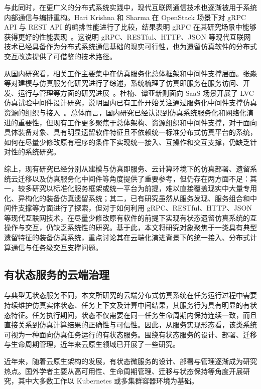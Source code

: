 \documentclass[lang=chs, degree=master, blindreview=true, winfonts=true, academic=false]{yanputhesis}
\begin{document}
与此同时，在更广义的分布式系统实践中，现代互联网通信技术也逐渐被用于系统内部通信与编排重构。Hari Krishna 和 Sharma 在 OpenStack 场景下对 gRPC API 与 REST API 的编排性能进行了比较，结果表明 gRPC 在其研究场景中能够获得更好的性能表现~\cite{HariKrishna2024gRPCvsREST}。这说明 gRPC、RESTful、HTTP、JSON 等现代互联网技术已经具备作为分布式系统通信基础的现实可行性，也为遗留仿真软件的分布式交互改造提供了可借鉴的技术路径。

从国内研究看，相关工作主要集中在仿真服务化总体框架和中间件支撑层面。张淼等对建模与仿真服务化研究进行了综述，系统梳理了仿真即服务在服务访问、开发、运行与管理等方面的研究进展~\cite{Zhang2023MSServiceReview}。杜楠、谭亚新则面向 SaaS 场景开展了 LVC 仿真试验中间件设计研究，说明国内已有工作开始关注通过服务化中间件支撑仿真资源的组织与接入~\cite{Du2021LVCSaaS}。总体而言，国内研究已经认识到仿真系统服务化和网络化演进的重要性，但现有工作更多聚焦于总体架构、资源组织和中间件支撑，对于面向具体装备对象、具有明显遗留软件特征且不依赖统一标准分布式仿真平台的系统，如何在尽量少修改原有程序的条件下实现统一接入、互操作和交互支撑，仍缺乏针对性的系统研究。

综上，现有研究已经分别从建模与仿真即服务、云计算环境下的仿真部署、遗留系统云迁移以及仿真服务化中间件等角度提供了重要参考，但仍存在两方面不足：其一，较多研究以标准化服务框架或统一平台为前提，难以直接覆盖现实中大量专用化、异构化的装备仿真遗留系统；其二，已有研究虽然从服务发现、服务组合和中间件支撑等方面进行了探索，但对于如何利用 gRPC、RESTful、HTTP、JSON 等现代互联网技术，在尽量少修改原有软件的前提下实现有状态遗留仿真系统的互操作与交互，仍缺乏系统性的研究。基于此，本文将研究对象聚焦于一类具有典型遗留特征的装备仿真系统，重点讨论其在云端化演进背景下的统一接入、分布式计算通信与任务级交互支撑问题。


\subsection{有状态服务的云端治理}

与典型无状态服务不同，本文所研究的云端分布式仿真系统在任务运行过程中需要持续维护仿真实体状态、任务上下文及计算中间结果，其服务行为具有明显的有状态特征。任务执行期间，状态不仅需要在同一任务生命周期内保持连续一致，而且直接关系到仿真计算结果的正确性与可信性。因此，从服务实现形态看，该类系统可视为一种面向仿真任务运行的有状态服务。围绕有状态服务的设计、部署、迁移与生命周期管理，近年来云原生领域已开展了一些研究。

近年来，随着云原生架构的发展，有状态微服务的设计、部署与管理逐渐成为研究热点。国外学者主要从高可用性、生命周期管理、迁移与状态保持等角度开展研究，其中大多数工作以 Kubernetes 或多集群容器环境为基础。
\end{document}
